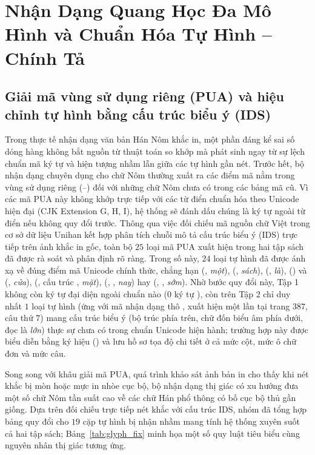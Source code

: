 \section{Nhận Dạng Quang Học Đa Mô Hình và Chuẩn Hóa Tự Hình -- Chính Tả}

\subsection{Giải mã vùng sử dụng riêng (PUA) và hiệu chỉnh tự hình bằng cấu trúc biểu ý (IDS)}

Trong thực tế nhận dạng văn bản Hán Nôm khắc in, một phần đáng kể sai số dóng hàng không bắt nguồn từ thuật toán so khớp mà phát sinh ngay từ sự lệch chuẩn mã ký tự và hiện tượng nhầm lẫn giữa các tự hình gần nét. Trước hết, bộ nhận dạng chuyên dụng cho chữ Nôm thường xuất ra các điểm mã nằm trong vùng sử dụng riêng (--) đối với những chữ Nôm chưa có trong các bảng mã cũ. Vì các mã PUA này không khớp trực tiếp với các từ điển chuẩn hóa theo Unicode hiện đại (CJK Extension G, H, I), hệ thống sẽ đánh dấu chúng là ký tự ngoài từ điển nếu không quy đổi trước. Thông qua việc đối chiếu mã nguồn chữ Việt trong cơ sở dữ liệu Unihan \cite{unihan2025} kết hợp phân tích chuỗi mô tả cấu trúc biểu ý (IDS) \cite{morioka2008ids} trực tiếp trên ảnh khắc in gốc, toàn bộ $25$ loại mã PUA xuất hiện trong hai tập sách đã được rà soát và phân định rõ ràng. Trong số này, $24$ loại tự hình đã được ánh xạ về đúng điểm mã Unicode chính thức, chẳng hạn  (, \textit{một}),  (, \textit{sách}),  (, \textit{là}),  () và  (, \textit{cửa}),  (, cấu trúc , \textit{mặt}),  (, , \textit{nay}) hay  (, , \textit{sớm}). Nhờ bước quy đổi này, Tập 1 không còn ký tự đại diện ngoài chuẩn nào ($0$ ký tự ), còn trên Tập 2 chỉ duy nhất $1$ loại tự hình (ứng với mã nhận dạng thô , xuất hiện một lần tại trang $387$, câu thứ $7$) mang cấu trúc biểu ý  (bộ trúc  phía trên, chữ đốn  biểu âm phía dưới, đọc là \textit{lớn}) thực sự chưa có trong chuẩn Unicode hiện hành; trường hợp này được biểu diễn bằng ký hiệu  () và lưu hồ sơ tọa độ chi tiết ở cả mức cột, mức ô chữ đơn và mức câu.

Song song với khâu giải mã PUA, quá trình khảo sát ảnh bản in cho thấy khi nét khắc bị mòn hoặc mực in nhòe cục bộ, bộ nhận dạng thị giác có xu hướng đưa một số chữ Nôm tần suất cao về các chữ Hán phổ thông có bố cục bộ thủ gần giống. Dựa trên đối chiếu trực tiếp nét khắc với cấu trúc IDS, nhóm đã tổng hợp bảng quy đổi cho $19$ cặp tự hình bị nhận nhầm mang tính hệ thống xuyên suốt cả hai tập sách; Bảng~\ref{tab:glyph_fix} minh họa một số quy luật tiêu biểu cùng nguyên nhân thị giác tương ứng.

